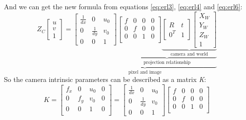 And we can get the new formula from equations \ref{eq:erl3}, \ref{eq:erl4} and \ref{eq:erl6}:
\begin{equation}\label{eq:erl7}
Z_C \begin{bmatrix} u \\ v \\ 1 \end{bmatrix}
      = \underbrace{  
        \begin{bmatrix} \frac{1}{dx} & 0 & u_0\\
                        0 & \frac{1}{dy} & v_0\\
                        0 & 0 & 1 \end{bmatrix}
        \underbrace{                   
        \begin{bmatrix} f & 0 & 0 & 0 \\
                        0 & f & 0 & 0 \\
                        0 & 0 & 1 & 0 \\ \end{bmatrix}
        \underbrace{                 
        \begin{bmatrix} R & t \\
                        0^T & 1 \end{bmatrix}                                          
        \begin{bmatrix} X_W \\ Y_W \\ Z_W \\ 1 \end{bmatrix}
        }_\text{camera and world}    
        }_\text{projection relationship} 
        }_\text{pixel and image}                  
\end{equation}
So the camera intrinsic parameters can be described as a matrix \textit{K}:
\begin{equation}\label{eq:erl8}
K = \begin{bmatrix} f_x & 0 & u_0 & 0 \\
                    0 & f_y & v_0 & 0 \\
                    0 & 0 & 1 & 0 \\ \end{bmatrix}
  =
    \begin{bmatrix} \frac{1}{dx} & 0 & u_0\\
                     0 & \frac{1}{dy} & v_0\\
                     0 & 0 & 1 \end{bmatrix}                 
    \begin{bmatrix} f & 0 & 0 & 0 \\
                    0 & f & 0 & 0 \\
                    0 & 0 & 1 & 0 \\ \end{bmatrix}                  
\end{equation}
